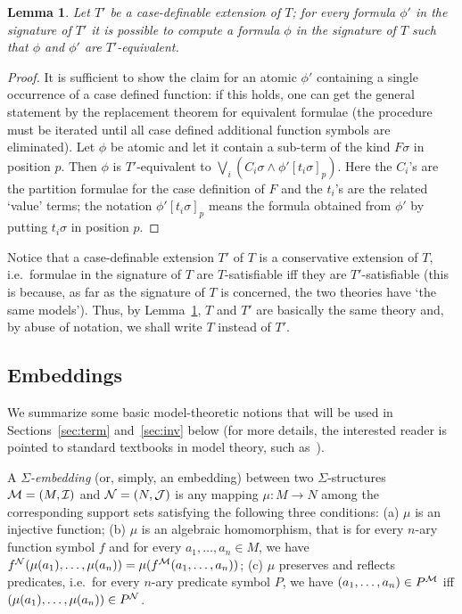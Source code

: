 \documentclass{LMCS}
\newcommand{\cM}{\ensuremath \mathcal M}
\newcommand{\cN}{\ensuremath \mathcal N}
\newcommand{\lra}{\longrightarrow}
\renewcommand{\int}{\ensuremath {\mathcal I}}
\theoremstyle{plain}\newtheorem{assumption}[thm]{Assumption}
\theoremstyle{plain}\newtheorem{proposition}[thm]{Proposition}
\theoremstyle{plain}\newtheorem{property}[thm]{Property}
\theoremstyle{plain}\newtheorem{example}[thm]{Example}
\theoremstyle{plain}\newtheorem{claim}[thm]{Claim}
\theoremstyle{plain}\newtheorem{lemma}[thm]{Lemma}
\begin{document}
\begin{lemma}
  \label{lem:extensions}
  Let $T'$ be a case-definable extension of $T$; for every formula
  $\phi'$ in the signature of $T'$ it is possible to compute a formula
  $\phi$ in the signature of $T$ such that $\phi$ and $\phi'$ are
  $T'$-equivalent.
\end{lemma}
\begin{proof}
  It is sufficient to show the claim for an atomic $\phi'$ containing
  a single occurrence of a case defined function: if this holds, one
  can get the general statement by the replacement theorem for
  equivalent formulae (the procedure must be iterated until all case
  defined additional function symbols are eliminated). Let $\phi$ be
  atomic and let it contain a sub-term of the kind $F\sigma$ in
  position $p$.  Then $\phi$ is $T'$-equivalent to $\bigvee_i
  (C_i\sigma\wedge \phi'[t_i\sigma]_p)$. Here the $C_i$'s are the
  partition formulae for the case definition of $F$ and the $t_i$'s
  are the related `value' terms; the notation $\phi'[t_i\sigma]_p$
  means the formula obtained from $\phi'$ by putting $t_i\sigma$ in
  position $p$.
\end{proof}
Notice that a case-definable extension $T'$ of $T$ is a conservative
extension of $T$, i.e.\ formulae in the signature of $T$ are
$T$-satisfiable iff they are $T'$-satisfiable (this is because, as far
as the signature of $T$ is concerned, the two theories have `the same
models').
Thus, by Lemma~\ref{lem:extensions}, $T$ and $T'$ are basically the
same theory and, by abuse of notation, we shall write $T$ instead of
$T'$.

\subsection{Embeddings}
\label{subsec:embed}
We summarize some basic model-theoretic notions that will be used in
Sections~\ref{sec:term} and~\ref{sec:inv} below (for more details, the
interested reader is pointed to standard textbooks in model theory,
such as~\cite{CK}).

A {\it $\Sigma$-embedding} (or, simply, an embedding) between two
$\Sigma$-structu\-res $\cM=(M, \int)$ and $\cN=(N,\mathcal J)$ is any
mapping $\mu: M \lra N$ among the corresponding support sets
satisfying the following three conditions: (a) $\mu$ is an injective
function; (b) $\mu$ is an algebraic homomorphism, that is for every
$n$-ary function symbol $f$ and for every $a_1, \dots, a_n\in M$, we
have $f^{\cN}(\mu(a_1), \dots, \mu(a_n))= \mu(f^{\cM}(a_1, \dots,
a_n))$; (c) $\mu$ preserves and reflects predicates, i.e.\ for every
$n$-ary predicate symbol $P$, we have $(a_1, \dots, a_n)\in P^{\cM}$
iff $(\mu(a_1), \dots, \mu(a_n))\in P^{\cN}$.
\end{document}
